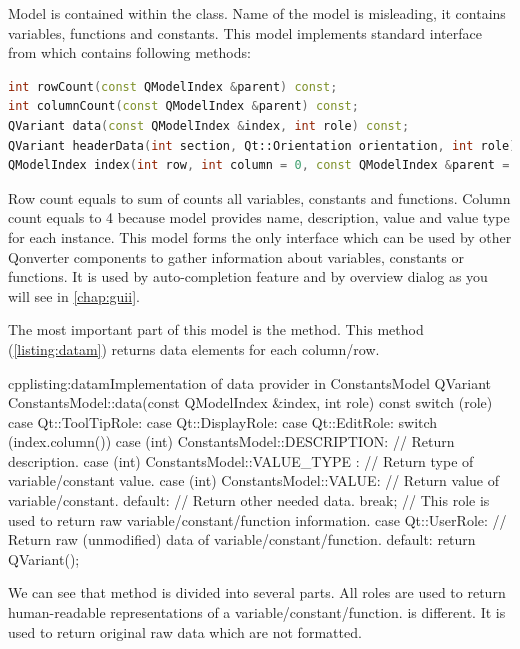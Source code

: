 Model is contained within the class. Name of the model is misleading, it contains variables, functions and constants. This model implements standard interface from which contains following methods:
\begin{lstlisting}[language=cpp,firstnumber=1]
int rowCount(const QModelIndex &parent) const;
int columnCount(const QModelIndex &parent) const;
QVariant data(const QModelIndex &index, int role) const;
QVariant headerData(int section, Qt::Orientation orientation, int role) const;
QModelIndex index(int row, int column = 0, const QModelIndex &parent = QModelIndex()) const;
\end{lstlisting}
Row count equals to sum of counts all variables, constants and functions. Column count equals to 4 because model provides name, description, value and value type for each instance. This model forms the only interface which can be used by other Qonverter components to gather information about variables, constants or functions. It is used by auto-completion feature and by overview dialog as you will see in \autoref{chap:guii}.

The most important part of this model is the method. This method (\autoref{listing:datam}) returns data elements for each column/row.

\begin{fdoccode}{cpp}{listing:datam}{Implementation of data provider in ConstantsModel}
QVariant ConstantsModel::data(const QModelIndex &index, int role) const {
  switch (role) {
    case Qt::ToolTipRole:
    case Qt::DisplayRole:
    case Qt::EditRole:
      switch (index.column()) {
        case (int) ConstantsModel::DESCRIPTION: {
          // Return description.
        }
        case (int) ConstantsModel::VALUE_TYPE : {
          // Return type of variable/constant value.
        }
        case (int) ConstantsModel::VALUE: {
          // Return value of variable/constant.
        }
        default:
          // Return other needed data.
      }
      break;
    // This role is used to return raw variable/constant/function information.
    case Qt::UserRole:
      // Return raw (unmodified) data of variable/constant/function.
    default:
      return QVariant();
  }
}
\end{fdoccode}

We can see that method is divided into several parts. All roles are used to return human-readable representations of a variable/constant/function. is different. It is used to return original raw data which are not formatted.

